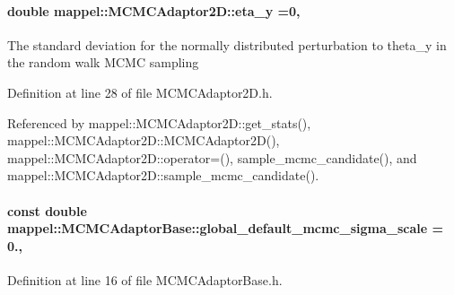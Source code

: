 \paragraph[{\texorpdfstring{eta\+\_\+y}{eta_y}}]{\setlength{\rightskip}{0pt plus 5cm}double mappel\+::\+M\+C\+M\+C\+Adaptor2\+D\+::eta\+\_\+y =0\hspace{0.3cm}{\ttfamily [protected]}, {\ttfamily [inherited]}}\hypertarget{classmappel_1_1MCMCAdaptor2D_a8e49652147538fe2a12943522f1a8b30}{}\label{classmappel_1_1MCMCAdaptor2D_a8e49652147538fe2a12943522f1a8b30}
The standard deviation for the normally distributed perturbation to theta\+\_\+y in the random walk M\+C\+MC sampling 

Definition at line 28 of file M\+C\+M\+C\+Adaptor2\+D.\+h.



Referenced by mappel\+::\+M\+C\+M\+C\+Adaptor2\+D\+::get\+\_\+stats(), mappel\+::\+M\+C\+M\+C\+Adaptor2\+D\+::\+M\+C\+M\+C\+Adaptor2\+D(), mappel\+::\+M\+C\+M\+C\+Adaptor2\+D\+::operator=(), sample\+\_\+mcmc\+\_\+candidate(), and mappel\+::\+M\+C\+M\+C\+Adaptor2\+D\+::sample\+\_\+mcmc\+\_\+candidate().

\paragraph[{\texorpdfstring{global\+\_\+default\+\_\+mcmc\+\_\+sigma\+\_\+scale}{global_default_mcmc_sigma_scale}}]{\setlength{\rightskip}{0pt plus 5cm}const double mappel\+::\+M\+C\+M\+C\+Adaptor\+Base\+::global\+\_\+default\+\_\+mcmc\+\_\+sigma\+\_\+scale = 0.\hspace{0.3cm}{\ttfamily [static]}, {\ttfamily [inherited]}}\hypertarget{classmappel_1_1MCMCAdaptorBase_a44cebca0e27135c854fa8430d2d89929}{}\label{classmappel_1_1MCMCAdaptorBase_a44cebca0e27135c854fa8430d2d89929}


Definition at line 16 of file M\+C\+M\+C\+Adaptor\+Base.\+h.



